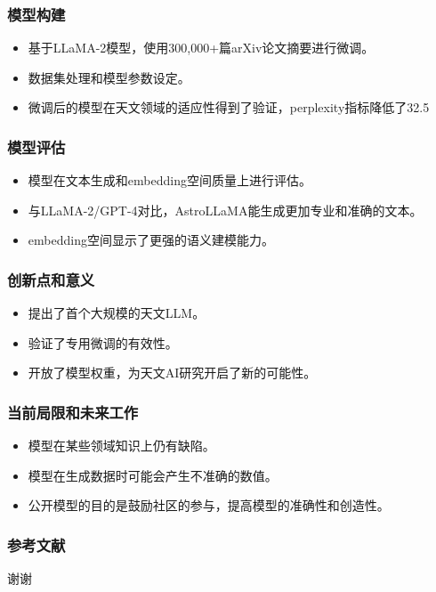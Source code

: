 \documentclass[10pt]{ctexbeamer}
\begin{document}
\begin{frame}[t]
  \frametitle{模型构建}
  \begin{itemize}
    \item 基于LLaMA-2模型，使用300,000+篇arXiv论文摘要进行微调。
    \item 数据集处理和模型参数设定。
    \item 微调后的模型在天文领域的适应性得到了验证，perplexity指标降低了32.5%
  \end{itemize}
\end{frame}

\begin{frame}[t]
  \frametitle{模型评估}
  \begin{itemize}
    \item 模型在文本生成和embedding空间质量上进行评估。
    \item 与LLaMA-2/GPT-4对比，AstroLLaMA能生成更加专业和准确的文本。
    \item embedding空间显示了更强的语义建模能力。
  \end{itemize}
\end{frame}

\begin{frame}[t]
  \frametitle{创新点和意义}
  \begin{itemize}
    \item 提出了首个大规模的天文LLM。
    \item 验证了专用微调的有效性。
    \item 开放了模型权重，为天文AI研究开启了新的可能性。
  \end{itemize}
\end{frame}

\begin{frame}[t]
  \frametitle{当前局限和未来工作}
  \begin{itemize}
    \item 模型在某些领域知识上仍有缺陷。
    \item 模型在生成数据时可能会产生不准确的数值。
    \item 公开模型的目的是鼓励社区的参与，提高模型的准确性和创造性。
  \end{itemize}
\end{frame}



\begin{frame}
  \frametitle{参考文献}
  \nocite{*}%
  \printbibliography%
\end{frame}

\begin{frame}[plain]
  \vfill
  \centerline{\Huge 谢谢}
  \vfill
\end{frame}
\end{document}
